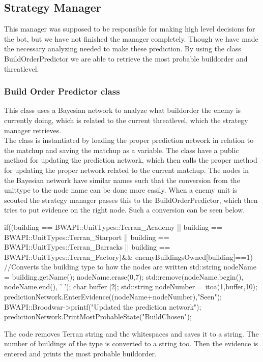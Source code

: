 	\subsection{Strategy Manager}
		This manager was supposed to be responsible for making high level decisions for the bot, but we have not finished the manager completely. Though 
		we have made the necessary analyzing needed to make these prediction. By using the class BuildOrderPredictor we are able to retrieve the most 
		probable buildorder and threatlevel.
		
		\subsubsection{Build Order Predictor class}
			This class uses a Bayesian network to analyze what buildorder the enemy is currently doing, which is related to the current threatlevel, which
			the strategy manager retrieves. \\
			
			The class is instantiated by loading the proper prediction network in relation to the matchup and saving the matchup as a variable. 
			The class have a public method for updating the prediction network, which then calls the proper method for updating the proper network related 
			to the current matchup. The nodes in the Bayesian network have similar names such that the conversion from the unittype to the node name can be 
			done more easily. When a enemy unit is scouted the strategy manager passes this to the BuildOrderPredictor, which then tries to put evidence 
			on the right node. Such a conversion can be seen below.
			\begin{Sourcecode}[caption=Conversion from unit type to node name]		
	if((building == BWAPI::UnitTypes::Terran_Academy || 
			building == BWAPI::UnitTypes::Terran_Starport ||
			building == BWAPI::UnitTypes::Terran_Barracks ||
			building == BWAPI::UnitTypes::Terran_Factory)&& 
			enemyBuildingsOwned[building]==1)
	{
		//Converts the building type to how the nodes are written
		std::string nodeName = building.getName();
		nodeName.erase(0,7);
		std::remove(nodeName.begin(), nodeName.end(), ' ');
		char buffer [2];
		std::string nodeNumber = itoa(1,buffer,10);	
		predictionNetwork.EnterEvidence((nodeName+nodeNumber),"Seen");
		BWAPI::Broodwar->printf("Updated the prediction network");
		predictionNetwork.PrintMostProbableState("BuildChosen");
	}
			\end{Sourcecode}
			 The code removes Terran string and the whitespaces and saves it to a string. The number of buildings of the type is converted to a string too. 
			 Then the evidence is entered and prints the most probable buildorder.
